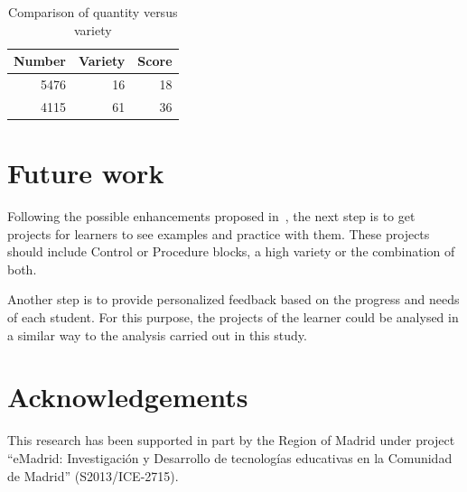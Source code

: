 \documentclass[a4paper]{article}
\begin{document}
\begin{table}
\begin{center}
\caption{Comparison of quantity versus variety}
\bigskip
\label{tab:comp-num-var}
\begin{tabular}{|r|r|r|}
\hline
Number & Variety & Score \\ \hline
5476 & 16 & 18\\ \hline
4115 & 61 & 36\\ \hline
\end{tabular}
\end{center}
\end{table}

\section{Future work}
Following the possible enhancements proposed in~\cite{robles2018ontools}, the next step is to get projects for learners to see examples and practice with them. These projects should include Control or Procedure blocks, a high variety or the combination of both. 

Another step is to provide personalized feedback based on the progress and needs of each student. For this purpose, the projects of the learner could be analysed in a similar way to the analysis carried out in this study.

\section*{Acknowledgements}
This research has been supported in part 
by the Region of Madrid under project ``eMadrid:
Investigaci\'on y Desarrollo de tecnolog\'ias educativas en la
Comunidad de Madrid'' (S2013/ICE-2715).


 

\end{document}
